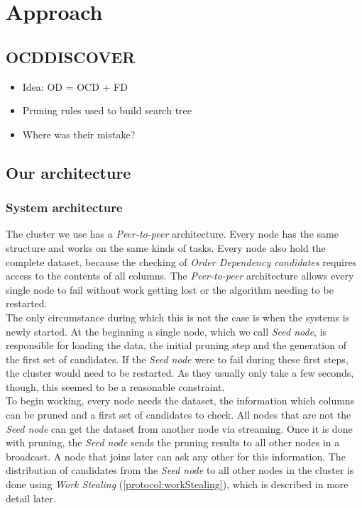 
\section{Approach}\label{sec:approach}
 
\subsection{OCDDISCOVER}
\begin{itemize}
	\item Idea: OD = OCD + FD
	\item Pruning rules used to build search tree
	\item Where was their mistake?
\end{itemize}

\subsection{Our architecture}
\subsubsection{System architecture}
The cluster we use has a \emph{Peer-to-peer} architecture.
Every node has the same structure and works on the same kinds of tasks.
Every node also hold the complete dataset, because the checking of \emph{Order Dependency candidates} requires access to the contents of all columns.  
The \emph{Peer-to-peer} architecture allows every single node to fail without work getting lost or the algorithm needing to be restarted. \\
The only circumstance during which this is not the case is when the systems is newly started. 
At the beginning a single node, which we call \emph{Seed node}, is responsible for loading the data, the initial pruning step and the generation of the first set of candidates. 
If the \emph{Seed node} were to fail during these first steps, the cluster would need to be restarted. 
As they usually only take a few seconds, though, this seemed to be a reasonable constraint.\\
To begin working, every node needs the dataset, the information which columns can be pruned and a first set of candidates to check. 
All nodes that are not the \emph{Seed node} can get the dataset from another node via streaming. 
Once it is done with pruning, the \emph{Seed node} sends the pruning results to all other nodes in a broadcast.
A node that joins later can ask any other for this information.
The distribution of candidates from the \emph{Seed node} to all other nodes in the cluster is done using \emph{Work Stealing} (\ref{protocol:workStealing}), which is described in more detail later.

